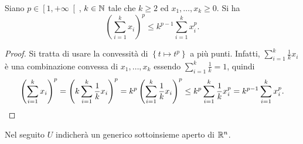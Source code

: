 \begin{proposizione}
Siano $p \in \left[ 1,+\infty\right[ $, $k \in \mathbb{N}$ tale che $k \ge 2$ ed $x_1,\dots, x_k \ge 0$. Si ha
\[ \left( \sum_{i=1}^{k}x_i\right)^p \le k^{p-1}\sum_{i=1}^{k}x_i^p. \]
\end{proposizione}
\begin{proof}
Si tratta di usare la convessità di $\left\lbrace t \mapsto t^p\right\rbrace$ a più punti. Infatti, $\displaystyle\sum_{i=1}^{k}\frac{1}{k}x_i $ è una combinazione convessa di $x_1,\dots, x_k$ essendo $\displaystyle\sum_{i=1}^{k}\frac{1}{k} = 1$, 
quindi
\begin{align*}
	\left( \sum_{i=1}^{k}x_i\right)^p = \left( k\sum_{i=1}^{k}\frac{1}{k}x_i\right)^p = k^p  \left(\sum_{i=1}^{k}\frac{1}{k}x_i\right)^p \le k^p \sum_{i=1}^{k}\frac{1}{k}x_i^p = k^{p-1}\sum_{i=1}^{k}x_i^p.\qedhere
\end{align*}
\end{proof}

Nel seguito $U$ indicherà un generico sottoinsieme aperto di $\mathbb{R}^n$. 

